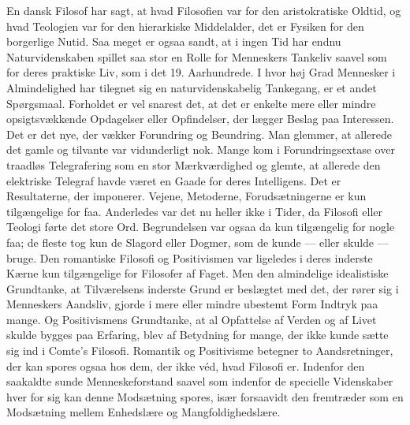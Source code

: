 \documentclass[12pt,a4paper,openany]{book}
\begin{document}
En dansk Filosof har sagt, at hvad Filosofien var for den aristokratiske
Oldtid, og hvad Teologien var for den hierarkiske Middelalder,
det er Fysiken for den borgerlige Nutid. Saa meget er ogsaa
sandt, at i ingen Tid har endnu Naturvidenskaben spillet saa stor
en Rolle for Menneskers Tankeliv saavel som for deres praktiske
Liv, som i det 19. Aarhundrede. I hvor høj Grad Mennesker i Almindelighed
har tilegnet sig en naturvidenskabelig Tankegang, er et andet
Spørgsmaal. Forholdet er vel snarest det, at det er enkelte mere
eller mindre opsigtsvækkende Opdagelser eller Opfindelser, der lægger
Beslag paa Interessen. Det er det nye, der vækker Forundring
og Beundring. Man glemmer, at allerede det gamle og tilvante var
vidunderligt nok. Mange kom i Forundringsextase over traadløs Telegrafering
som en stor Mærkværdighed og glemte, at allerede den
elektriske Telegraf havde været en Gaade for deres Intelligens. Det
er Resultaterne, der imponerer. Vejene, Metoderne, Forudsætningerne
er kun tilgængelige for faa. Anderledes var det nu heller ikke
i Tider, da Filosofi eller Teologi førte det store Ord. Begrundelsen
var ogsaa da kun tilgængelig for nogle faa; de fleste tog kun de
Slagord eller Dogmer, som de kunde --- eller skulde --- bruge. Den
romantiske Filosofi og Positivismen var ligeledes i deres inderste
Kærne kun tilgængelige for Filosofer af Faget. Men den almindelige
idealistiske Grundtanke, at Tilværelsens inderste Grund er beslægtet
med det, der rører sig i Menneskers Aandsliv, gjorde i mere
eller mindre ubestemt Form Indtryk paa mange. Og Positivismens
Grundtanke, at al Opfattelse af Verden og af Livet skulde bygges
paa Erfaring, blev af Betydning for mange, der ikke kunde sætte
sig ind i Comte’s Filosofi. Romantik og Positivisme betegner to
Aandsretninger, der kan spores ogsaa hos dem, der ikke véd, hvad
Filosofi er. Indenfor den saakaldte sunde Menneskeforstand saavel
som indenfor de specielle Videnskaber hver for sig kan denne Modsætning
spores, især forsaavidt den fremtræder som en Modsætning
mellem Enhedslære og Mangfoldighedslære.
\end{document}
